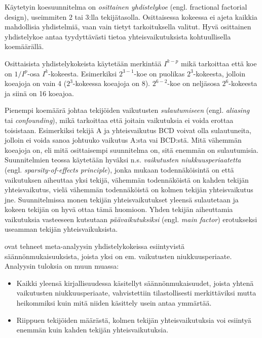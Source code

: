 \documentclass[12pt,a4paper,finnish]{tutthesis}
\begin{document}
Käytetyin koesuunnitelma on \textit{osittainen yhdistelykoe} (engl. fractional factorial
design), useimmiten 2 tai 3:lla tekijätasolla. Osittaisessa kokeessa ei ajeta
kaikkia mahdollisia yhdistelmiä, vaan vain tietyt tarkoituksella valitut. Hyvä
osittainen yhdistelykoe antaa tyydyttävästi tietoa yhteisvaikutuksista
kohtuullisella koemäärällä.

Osittaisista yhdistelykokeista käytetään merkintää \(I^{k - p}\)
mikä tarkoittaa että koe on \(1/I^p\)-osa \(I^k\)-kokeesta.
Esimerkiksi \(2^{3 - 1}\)-koe on puolikas \(2^3\)-kokeesta,
jolloin koeajoja on vain 4 (\(2^3\)-kokeessa koeajoja on 8).
\(2^{6-2}\)-koe on neljäsosa \(2^6\)-kokeesta
ja siinä on 16 koeajoa.

Pienempi koemäärä johtaa tekijöiden vaikutusten
\textit{sulautumiseen}
(engl. \textit{aliasing} tai \textit{confounding}), mikä tarkoittaa että joitain
vaikutuksia ei voida erottaa toisistaan. Esimerkiksi tekijä A ja yhteisvaikutus BCD
voivat olla sulautuneita, jolloin ei voida sanoa johtuuko vaikutus A:sta vai
BCD:stä. Mitä vähemmän koeajoja on, eli mitä osittaisempi suunnitelma on, sitä
enemmän on sulautumisia. Suunnitelmien teossa käytetään hyväksi n.s.
\textit{vaikutusten niukkuusperiaatetta} (engl. \textit{sparsity-of-effects principle}),
jonka mukaan todennäköisintä on että vaikutuksen aiheuttaa yksi tekijä, vähemmän
todennäköistä on kahden tekijän yhteisvaikutus, vielä vähemmän todennäköistä on
kolmen tekijän yhteisvaikutus jne.
Suunnitelmissa monen tekijän yhteisvaikutukset
yleensä sulautetaan ja kokeen tekijän on hyvä ottaa tämä huomioon.
Yhden tekijän aiheuttamia vaikutuksia vasteeseen kutsutaan \textit{päävaikutuksiksi}
(engl. \textit{main factor}) erotukseksi useamman tekijän yhteisvaikuksista.

\textcite{Li2006} ovat tehneet meta-analyysin yhdistelykokeissa esiintyvistä
säännönmukaisuuksista, joista yksi on em. vaikutusten niukkuusperiaate.
Analyysin tuloksia on muun muassa:

\begin{itemize}
\item Kaikki yleensä kirjallisuudessa käsitellyt säännönmukaisuudet, joista yhtenä
    vaikutusten niukkuusperiaate, vahvistettiin tilastollisesti merkittäviksi mutta
    heikommiksi kuin mitä niiden käsittely usein antaa ymmärtää.
\item Riippuen tekijöiden määrästä, kolmen tekijän yhteisvaikutuksia voi esiintyä
    enemmän kuin kahden tekijän yhteisvaikutuksia.
\end{itemize}
\end{document}
